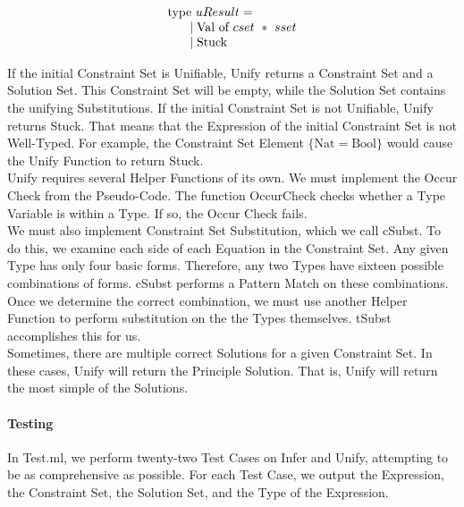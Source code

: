 \documentclass{article}
\begin{document}
\begin{equation}
    \begin{array}{l}
    \text{type} \ uResult = \\
    \indent \mid \text{Val of} \ cset \ * \ sset \\
    \indent \mid \text{Stuck}
    \end{array}
\end{equation}

If the initial Constraint Set is Unifiable, Unify returns a Constraint Set and a Solution Set. This Constraint Set will be empty, while the Solution Set contains the unifying Substitutions. If the initial Constraint Set is not Unifiable, Unify returns Stuck. That means that the Expression of the initial Constraint Set is not Well-Typed. For example, the Constraint Set Element $\{\text{Nat} = \text{Bool}\}$ would cause the Unify Function to return Stuck. \\

Unify requires several Helper Functions of its own. We must implement the Occur Check from the Pseudo-Code. The function OccurCheck checks whether a Type Variable is within a Type. If so, the Occur Check fails.\\

We must also implement Constraint Set Substitution, which we call cSubst. To do this, we examine each side of each Equation in the Constraint Set. Any given Type has only four basic forms. Therefore, any two Types have sixteen possible combinations of forms. cSubst performs a Pattern Match on these combinations. Once we determine the correct combination, we must use another Helper Function to perform substitution on the the Types themselves. tSubst accomplishes this for us. \\

Sometimes, there are multiple correct Solutions for a given Constraint Set. In these cases, Unify will return the Principle Solution. That is, Unify will return the most simple of the Solutions.

\paragraph{Testing}

In Test.ml, we perform twenty-two Test Cases on Infer and Unify, attempting to be as comprehensive as possible. For each Test Case, we output the Expression, the Constraint Set, the Solution Set, and the Type of the Expression. \\
\end{document}
